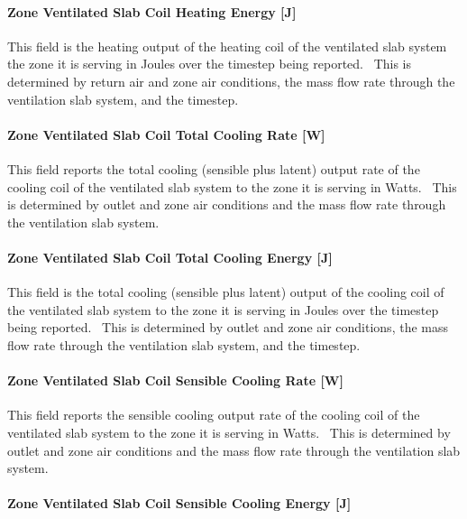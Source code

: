 \paragraph{Zone Ventilated Slab Coil Heating Energy {[}J{]}}\label{zone-ventilated-slab-coil-heating-energy-j}

This field is the heating output of the heating coil of the ventilated slab system the zone it is serving in Joules over the timestep being reported.~ This is determined by return air and zone air conditions, the mass flow rate through the ventilation slab system, and the timestep.

\paragraph{Zone Ventilated Slab Coil Total Cooling Rate {[}W{]}}\label{zone-ventilated-slab-coil-total-cooling-rate-w}

This field reports the total cooling (sensible plus latent) output rate of the cooling coil of the ventilated slab system to the zone it is serving in Watts.~ This is determined by outlet and zone air conditions and the mass flow rate through the ventilation slab system.

\paragraph{Zone Ventilated Slab Coil Total Cooling Energy {[}J{]}}\label{zone-ventilated-slab-coil-total-cooling-energy-j}

This field is the total cooling (sensible plus latent) output of the cooling coil of the ventilated slab system to the zone it is serving in Joules over the timestep being reported.~ This is determined by outlet and zone air conditions, the mass flow rate through the ventilation slab system, and the timestep.

\paragraph{Zone Ventilated Slab Coil Sensible Cooling Rate {[}W{]}}\label{zone-ventilated-slab-coil-sensible-cooling-rate-w}

This field reports the sensible cooling output rate of the cooling coil of the ventilated slab system to the zone it is serving in Watts.~ This is determined by outlet and zone air conditions and the mass flow rate through the ventilation slab system.

\paragraph{Zone Ventilated Slab Coil Sensible Cooling Energy {[}J{]}}\label{zone-ventilated-slab-coil-sensible-cooling-energy-j}

